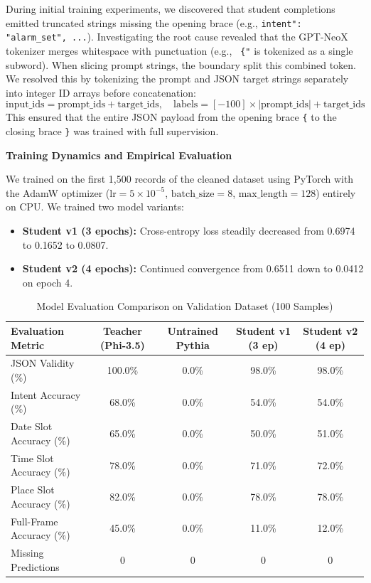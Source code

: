\documentclass[10pt,a4paper]{article}
\begin{document}
During initial training experiments, we discovered that student completions emitted truncated strings missing the opening brace (e.g., \texttt{intent": "alarm\_set", ...}). Investigating the root cause revealed that the GPT-NeoX tokenizer merges whitespace with punctuation (e.g., \verb| {"| is tokenized as a single subword). When slicing prompt strings, the boundary split this combined token. We resolved this by tokenizing the prompt and JSON target strings separately into integer ID arrays before concatenation:
\begin{equation*}
\text{input\_ids} = \text{prompt\_ids} + \text{target\_ids}, \quad \text{labels} = [-100] \times |\text{prompt\_ids}| + \text{target\_ids}
\end{equation*}
This ensured that the entire JSON payload from the opening brace \texttt{\{} to the closing brace \texttt{\}} was trained with full supervision.

\clearpage

\textbf{Training Dynamics and Empirical Evaluation}

We trained on the first 1,500 records of the cleaned dataset using PyTorch with the AdamW optimizer ($\text{lr} = 5 \times 10^{-5}$, $\text{batch\_size} = 8$, $\text{max\_length} = 128$) entirely on CPU. We trained two model variants:
\begin{itemize}
    \item \textbf{Student v1 (3 epochs):} Cross-entropy loss steadily decreased from 0.6974 to 0.1652 to 0.0807.
    \item \textbf{Student v2 (4 epochs):} Continued convergence from 0.6511 down to 0.0412 on epoch 4.
\end{itemize}

\begin{table}[h!]
\centering
\small
\begin{tabular}{lcccc}
\toprule
\textbf{Evaluation Metric} & \textbf{Teacher (Phi-3.5)} & \textbf{Untrained Pythia} & \textbf{Student v1 (3 ep)} & \textbf{Student v2 (4 ep)} \\
\midrule
JSON Validity (\%) & 100.0\% & 0.0\% & 98.0\% & 98.0\% \\
Intent Accuracy (\%) & 68.0\% & 0.0\% & 54.0\% & 54.0\% \\
Date Slot Accuracy (\%) & 65.0\% & 0.0\% & 50.0\% & 51.0\% \\
Time Slot Accuracy (\%) & 78.0\% & 0.0\% & 71.0\% & 72.0\% \\
Place Slot Accuracy (\%) & 82.0\% & 0.0\% & 78.0\% & 78.0\% \\
Full-Frame Accuracy (\%) & 45.0\% & 0.0\% & 11.0\% & 12.0\% \\
Missing Predictions & 0 & 0 & 0 & 0 \\
\bottomrule
\end{tabular}
\caption{Model Evaluation Comparison on Validation Dataset (100 Samples)}
\label{tab:task2_eval}
\end{table}
\end{document}
